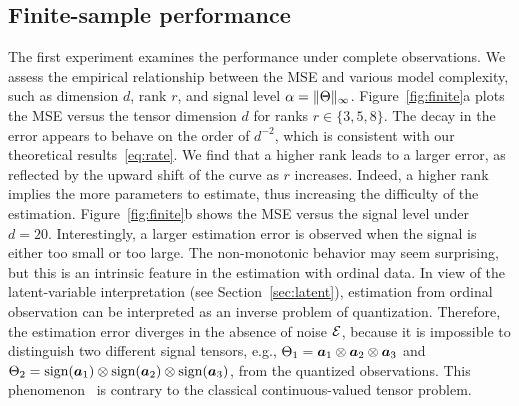 \documentclass{article}
\theoremstyle{plain}
\theoremstyle{definition}
\begin{document}
\subsection{Finite-sample performance}\label{sec:simulation}
\vspace{-.2cm}
The first experiment examines the performance under complete observations. We assess the empirical relationship between the MSE and various  model complexity, such as dimension $d$, rank $r$, and signal level $\alpha=\lVert\Theta\rVert_\infty$. Figure~\ref{fig:finite}a plots the MSE versus the tensor dimension $d$ for ranks $r\in\{3,5,8\}$. The decay in the error appears to behave on the order of $d^{-2}$, which is consistent with our theoretical results~\eqref{eq:rate}. We find that a higher rank leads to a larger error, as reflected by the upward shift of the curve as $r$ increases. Indeed, a higher rank implies the more parameters to estimate, thus increasing the difficulty of the estimation. Figure~\ref{fig:finite}b shows the MSE versus the signal level under $d=20$. Interestingly, a larger estimation error is observed when the signal is either too small or too large. The non-monotonic behavior may seem surprising, but this is an intrinsic feature in the estimation with ordinal data. In view of the latent-variable interpretation (see Section~\ref{sec:latent}), estimation from ordinal observation can be interpreted as an inverse problem of quantization. Therefore, the estimation error diverges in the absence of noise $\mathcal{E}$, because it is impossible to distinguish two different signal tensors, e.g., $\Theta_1=\bm{a}_1\otimes \bm{a}_2\otimes \bm{a}_3$ and $\Theta_2=\text{sign}(\bm{a}_1)\otimes \text{sign}(\bm{a}_2)\otimes \text{sign}(\bm{a}_3)$, from the quantized observations. This phenomenon~\cite{davenport2014,sur2019modern} is  contrary to the classical continuous-valued tensor problem.
\end{document}
